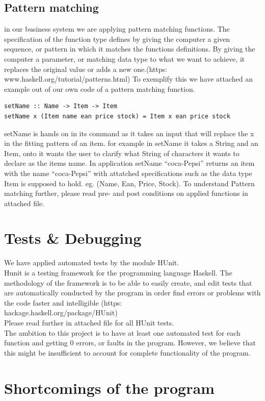 \documentclass[11pt]{article}
\begin{document}
\subsection{Pattern matching}
in our business system we are applying pattern matching functions. The specification of the function type defines by giving the computer a given sequence, or pattern in which it matches the functions definitions. By giving the computer a parameter, or matching data type to what we want to achieve, it replaces the original value or adds a new one.(https:\\www.haskell.org/tutorial/patterns.html)
To exemplify this we have attached an example out of our own code of a pattern matching function.
\begin{lstlisting}
setName :: Name -> Item -> Item
setName x (Item name ean price stock) = Item x ean price stock
\end{lstlisting}
setName is hands on in its command as it takes an input that will replace the x in the fitting pattern of an item. for example in setName it takes a String and an Item, onto it wants the user to clarify what String of characters it wants to declare as the items name.
In application setName “coca-Pepsi” returns an item with the name “coca-Pepsi” with attatched specifications such as the data type Item is supposed to hold. eg. (Name, Ean, Price, Stock). To understand Pattern matching further, please read pre- and post conditions on applied functions in attached file.
\newpage
\section{Tests \& Debugging}
We have applied automated tests by the module HUnit.\\
Hunit is a testing framework for the programming language Haskell. The methodology of the framework is to be able to easily create, and edit tests that are automatically conducted by the program in order find errors or problems with the code faster and intelligible (https:\\hackage.haskell.org/package/HUnit)
\\
Please read further in attached file for all HUnit tests.
\\
The ambition to this project is to have at least one automated test for each function and getting 0 errors, or faults in the program. However, we believe that this might be insufficient to account for complete functionality of the program.
\newpage
\section{Shortcomings of the program}
\end{document}
